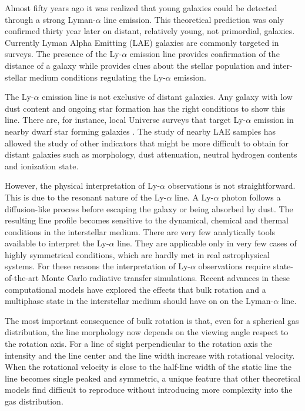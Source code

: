 \documentclass[a4paper, usenatbib, 12pt]{article}
\begin{document}
{Almost fifty years ago \cite{PartridgePeebles} it was realized that
young galaxies could be detected through a strong Lyman-$\alpha$ line
emission.  
This theoretical prediction was only confirmed thirty year later on
distant, relatively young, not primordial, galaxies.
Currently Lyman Alpha Emitting (LAE) galaxies are commonly targeted
in surveys. 
The presence of the Ly-$\alpha$ emission line provides confirmation of
the distance of a galaxy while provides clues about the stellar
population and inter-stellar medium conditions regulating the
Ly-$\alpha$ emission. 

The Ly-$\alpha$ emission line is not exclusive of distant galaxies. 
Any galaxy with low dust content and ongoing star formation has the
right conditions to show this line.  
There are, for instance,  local Universe surveys that target
Ly-$\alpha$ emission in nearby dwarf star forming galaxies 
\cite{LARS}. 
The study of nearby LAE samples has allowed the study of other
indicators that might be more difficult to obtain for distant galaxies
such as morphology, dust attenuation, neutral hydrogen contents and
ionization state.  

However, the physical interpretation of Ly-$\alpha$ observations is
not straightforward. 
This is due to the resonant nature of the Ly-$\alpha$ line. 
A Ly-$\alpha$ photon follows a diffusion-like process before escaping
the galaxy or being absorbed by dust. 
The resulting line profile becomes sensitive to the dynamical, chemical
and thermal conditions in the interstellar medium. 
There are very few analytically tools available to interpret the
Ly-$\alpha$ line.
They are applicable only in very few cases of highly symmetrical
conditions, which are hardly met in real astrophysical systems.
For these reasons the interpretation of Ly-$\alpha$ observations
require state-of-the-art Monte Carlo radiative transfer simulations.   
Recent advances in these computational models have explored the
effects that bulk rotation and a multiphase state in the interstellar
medium should have on on the Lyman-$\alpha$ line.

The most important consequence of bulk rotation is that, even for a
spherical gas distribution, the line morphology now depends on the
viewing angle respect to the rotation axis.  
For a line of sight perpendicular to the rotation axis the intensity
and the line center and the line width increase with rotational
velocity. 
When the rotational velocity is close to the half-line width of the
static line the line becomes single peaked and symmetric, a unique
feature that other theoretical models find difficult to reproduce
without introducing more complexity into the gas distribution. 

}
\end{document}
